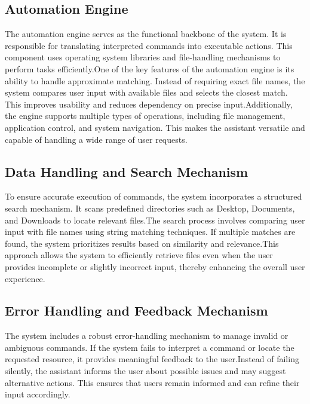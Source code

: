\documentclass[conference]{IEEEtran}
\begin{document}
\subsection{Automation Engine}
\noindent
The automation engine serves as the functional backbone of the system. It is responsible for translating interpreted commands into executable actions. This component uses operating system libraries and file-handling mechanisms to perform tasks efficiently.One of the key features of the automation engine is its ability to handle approximate matching. Instead of requiring exact file names, the system compares user input with available files and selects the closest match. This improves usability and reduces dependency on precise input.Additionally, the engine supports multiple types of operations, including file management, application control, and system navigation. This makes the assistant versatile and capable of handling a wide range of user requests.

\subsection{Data Handling and Search Mechanism}
\noindent
To ensure accurate execution of commands, the system incorporates a structured search mechanism. It scans predefined directories such as Desktop, Documents, and Downloads to locate relevant files.The search process involves comparing user input with file names using string matching techniques. If multiple matches are found, the system prioritizes results based on similarity and relevance.This approach allows the system to efficiently retrieve files even when the user provides incomplete or slightly incorrect input, thereby enhancing the overall user experience.

\subsection{Error Handling and Feedback Mechanism}
\noindent
The system includes a robust error-handling mechanism to manage invalid or ambiguous commands. If the system fails to interpret a command or locate the requested resource, it provides meaningful feedback to the user.Instead of failing silently, the assistant informs the user about possible issues and may suggest alternative actions. This ensures that users remain informed and can refine their input accordingly.
\end{document}
